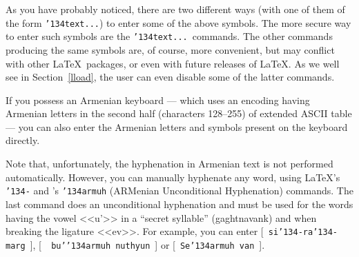 \documentclass[12pt,a4paper,draft]{article}
\def\mybs{\char'134}
\begin{document}
As you have probably noticed, there are two different ways (with one of them
of the form {\tt \mybs text...}) to enter some of the above symbols. The more
secure way to enter such symbols are the {\tt \mybs text...}\ commands. The
other commands producing the same symbols are, of course, more convenient, but
may conflict with other \LaTeX\ packages, or even with future releases of
\LaTeX. As we well see in Section~\ref{lload}, the user can even disable some
of the latter commands.

If you possess an Armenian keyboard --- which uses an encoding having Armenian
letters in the second half (characters 128--255) of extended ASCII table ---
you can also enter the Armenian letters and symbols present on the keyboard
directly.

Note that, unfortunately, the hyphenation in Armenian text is not performed
automatically. However, you can manually hyphenate any word, using \LaTeX's
{\tt\mybs -} and \ArmTeX's {\tt\mybs armuh} (ARMenian Unconditional
Hyphenation) commands. The last command does an unconditional hyphenation and
must be used for the words having the vowel {\artm <<u'>>} in a ``secret
syllable'' ({\artm gaghtnavank}) and when breaking the ligature {\artm
  <<ev>>}. For example, you can enter [~{\tt si\mybs-ra\mybs-marg}~], [~{\tt
    bu'\mybs armuh\ nuthyun}~] or [~{\tt Se\mybs armuh\ van}~].
\end{document}
